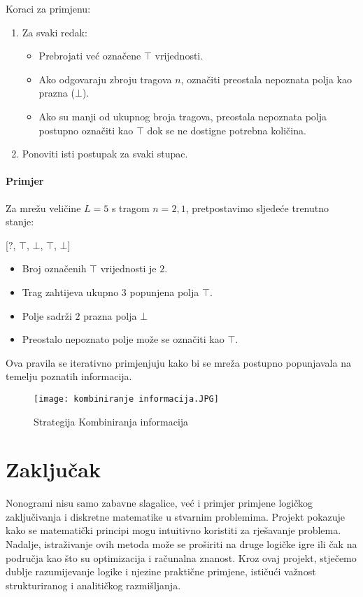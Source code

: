 \documentclass[a4paper,12pt]{article}
\begin{document}
Koraci za primjenu:
\begin{enumerate}
    \item Za svaki redak:
    \begin{itemize}
        \item Prebrojati već označene $\top$ vrijednosti.
        \item Ako odgovaraju zbroju tragova $n$, označiti preostala nepoznata polja kao prazna ($\bot$).
        \item Ako su manji od ukupnog broja tragova, preostala nepoznata polja postupno označiti kao $\top$ dok se ne dostigne potrebna količina.
    \end{itemize}
    \item Ponoviti isti postupak za svaki stupac.
\end{enumerate}

\paragraph{Primjer}  

Za mrežu veličine $L=5$ s tragom $n=2,1$, pretpostavimo sljedeće trenutno stanje:

\begin{center}
[$?$, $\top$, $\bot$, $\top$, $\bot$]
\end{center}

\noindent
\begin{itemize}
    \item Broj označenih $\top$ vrijednosti je $2$.
    \item Trag zahtijeva ukupno $3$ popunjena polja $\top$.
    \item Polje sadrži $2$ prazna polja $\bot$
    \item Preostalo nepoznato polje može se označiti kao $\top$.
\end{itemize}

Ova pravila se iterativno primjenjuju kako bi se mreža postupno popunjavala na temelju poznatih informacija.

\begin{figure}[h]
\centering
\texttt{[image: kombiniranje informacija.JPG]}
\caption{Strategija Kombiniranja informacija}
\end{figure}

\clearpage

\section{Zaključak}
Nonogrami nisu samo zabavne slagalice, već i primjer primjene logičkog zaključivanja i diskretne matematike u stvarnim problemima. Projekt pokazuje kako se matematički principi mogu intuitivno koristiti za rješavanje problema. Nadalje, istraživanje ovih metoda može se proširiti na druge logičke igre ili čak na područja kao što su optimizacija i računalna znanost. Kroz ovaj projekt, stječemo dublje razumijevanje logike i njezine praktične primjene, ističući važnost strukturiranog i analitičkog razmišljanja.
\end{document}
